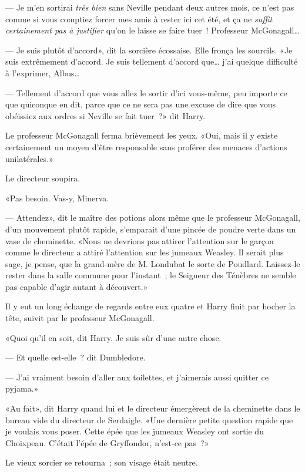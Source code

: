 --- Je m'en sortirai \emph{très bien} sans Neville pendant deux autres mois, ce n'est pas comme si vous comptiez forcer mes amis à rester ici cet été, et ça ne \emph{suffit certainement pas à justifier} qu'on le laisse se faire tuer~! Professeur McGonagall…

--- Je suis plutôt d'accord», dit la sorcière écossaise. Elle fronça les sourcils. «Je suis extrêmement d'accord. Je suis tellement d'accord que… j'ai quelque difficulté à l'exprimer, Albus…

--- Tellement d'accord que vous allez le sortir d'ici vous-même, peu importe ce que quiconque en dit, parce que ce ne sera pas une excuse de dire que vous obéissiez aux ordres si Neville se fait tuer~?» dit Harry.

Le professeur McGonagall ferma brièvement les yeux. «Oui, mais il y existe certainement un moyen d'être responsable sans proférer des menaces d'actions unilatérales.»

Le directeur soupira.

«Pas besoin. Vas-y, Minerva.

--- Attendez», dit le maître des potions alors même que le professeur McGonagall, d'un mouvement plutôt rapide, s'emparait d'une pincée de poudre verte dans un vase de cheminette. «Nous ne devrions pas attirer l'attention sur le garçon comme le directeur a attiré l'attention sur les jumeaux Weasley. Il serait plus sage, je pense, que la grand-mère de M. Londubat le sorte de Poudlard. Laissez-le rester dans la salle commune pour l'instant~; le Seigneur des Ténèbres ne semble pas capable d'agir autant à découvert.»

Il y eut un long échange de regards entre eux quatre et Harry finit par hocher la tête, suivit par le professeur McGonagall.

«Quoi qu'il en soit, dit Harry. Je suis sûr d'une autre chose.

--- Et quelle est-elle~? dit Dumbledore.

--- J'ai vraiment besoin d'aller aux toilettes, et j'aimerais aussi quitter ce pyjama.»

\later

«Au fait», dit Harry quand lui et le directeur émergèrent de la cheminette dans le bureau vide du directeur de Serdaigle. «Une dernière petite question rapide que je voulais vous poser. Cette épée que les jumeaux Weasley ont sortie du Choixpeau. C'était l'épée de Gryffondor, n'est-ce pas~?»

Le vieux sorcier se retourna~; son visage était neutre.

